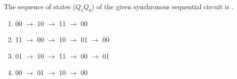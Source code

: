 The sequence of states ($Q_1Q_0$) of the given synchronous sequential circuit is \makebox[4em]{\hrulefill}.

\hfill{}




\begin{enumerate}[label=(\Alph*)]
    \item 00 $\to$ 10 $\to$ 11 $\to$ 00
    \item 11 $\to$ 00 $\to$ 10 $\to$ 01 $\to$ 00
    \item 01 $\to$ 10 $\to$ 11 $\to$ 00 $\to$ 01
    \item 00 $\to$ 01 $\to$ 10 $\to$ 00
\end{enumerate}